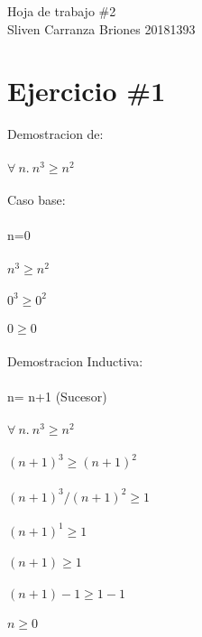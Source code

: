 \documentclass[10pt,a4paper]{article}
\author{Sliven Carranza}
\begin{document}
\begin{center}
         \huge{Hoja de trabajo \#2} \\
        \large{Sliven Carranza Briones 20181393} \\       
\end{center}

\section*{Ejercicio \#1 }
Demostracion de: \\ \\
       $ \forall\ n.\ n^3\geq n^2$ \\ \\
Caso base: \\ \\       
       n=0 \\ \\
        $  n^3\geq n^2$ \\ \\
        $  0^3\geq 0^2$ \\ \\
        $  0\geq 0$ \\ \\
Demostracion Inductiva: \\ \\
n=  n+1 (Sucesor)\\ \\
$ \forall\ n.\ n^3\geq n^2$ \\ \\
$ (n+1)^3\geq (n+1)^2$ \\ \\
$ (n+1)^3 / (n+1)^2  \geq 1 $ \\ \\
$ (n+1)^1  \geq 1 $ \\ \\
$ (n+1) \geq 1 $ \\ \\
$ (n+1)-1 \geq 1 -1 $ \\ \\
$ n \geq 0 $ \\ \\ \\ 
\end{document}
